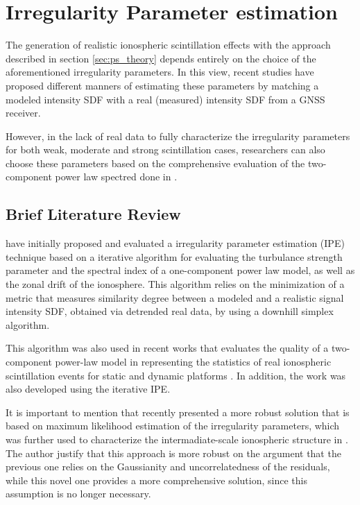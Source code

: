 \section{Irregularity Parameter estimation}
\label{sec:irregularity_parameter_estimation}
The generation of realistic ionospheric scintillation effects with the approach described in section \ref{sec:ps_theory} depends entirely on the choice of the aforementioned irregularity parameters. In this view, recent studies have proposed different manners of estimating these parameters by matching a modeled intensity SDF with a real (measured) intensity SDF from a GNSS receiver. 

However, in the lack of real data to fully characterize the irregularity parameters for both weak, moderate and strong scintillation cases, researchers can also choose these parameters based on the comprehensive evaluation of the two-component power law spectred done in \cite{Carrano2016OverviewOfTwoComponentPowerLaw}.
\subsection{Brief Literature Review}

\textcite{CarranoBrazil2012} have initially proposed and evaluated a irregularity parameter estimation (IPE) technique based on a iterative algorithm for evaluating the turbulance strength parameter and the spectral index of a one-component power law model, as well as the zonal drift of the ionosphere. This algorithm relies on the minimization of a metric that measures similarity degree between a modeled and a realistic signal intensity SDF, obtained via detrended real data, by using a downhill simplex algorithm. 

This algorithm was also used in recent works that evaluates the quality of a two-component power-law model in representing the statistics of real ionospheric scintillation events for static \cite{JiaoMultifrequencyScintillationOnGPSSignalsStaticPlatforms2018} and dynamic platforms \cite{JiaoScintillationOnGPSSignalsForDynamicPlatforms2018}. In addition, the work \cite{xuTwoparameterMultifrequencyGPS2020} was also developed using the iterative IPE.

It is important to mention that \textcite{carrano2017maximum} recently presented a more robust solution that is based on maximum likelihood estimation of the irregularity parameters, which was further used to characterize the intermadiate-scale ionospheric structure in \cite{Carrano2018IntermadiateScaleCharacterization}. The author justify that this approach is more robust on the argument that the previous one relies on the Gaussianity and uncorrelatedness of the residuals, while this novel one provides a more comprehensive solution, since this assumption is no longer necessary.

